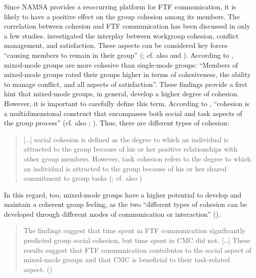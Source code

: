 \documentclass[output=paper]{langsci/langscibook}
\begin{document}
Since NAMSA provides a reoccurring platform for FTF communication, it is likely to have a positive effect on the group cohesion among its members. The correlation between cohesion and FTF communication has been discussed in only a few studies. \citet{ocker_mediating_2002} investigated the interplay between workgroup cohesion, conflict management, and satisfaction. These aspects can be considered key forces “causing members to remain in their group” (\citealt[246--247]{carron_development_1985}; cf. also \citealt[276]{brawley_assessing_1987} and \citealt{festinger_social_1950}). According to \citet[1]{ocker_mediating_2002}, mixed-mode groups are more cohesive than single-mode groups: “Members of mixed-mode groups rated their groups higher in terms of cohesiveness, the ability to manage conflict, and all aspects of satisfaction”. These findings provide a first hint that mixed-mode groups, in general, develop a higher degree of cohesion. However, it is important to carefully define this term. According to \citet[127]{shin_role_2011}, “cohesion is a multidimensional construct that encompasses both social and task aspects of the group process” (cf. also \citealt[276]{brawley_assessing_1987}; \citealt{carron_development_1985}). Thus, there are different types of cohesion:

\begin{quote}
[…] social cohesion is defined as the degree to which an individual is attracted to the group because of his or her positive relationships with other group members. However, task cohesion refers to the degree to which an individual is attracted to the group because of his or her shared commitment to group tasks (\citealt[127]{shin_role_2011}; cf. also \citealt[276]{brawley_assessing_1987})
\end{quote}

In this regard, too, mixed-mode groups have a higher potential to develop and maintain a coherent group feeling, as the two “different types of cohesion can be developed through different modes of communication or interaction” (\citealt[136]{shin_role_2011}). 

\begin{quote}
The findings suggest that time spent in FTF communication significantly predicted group social cohesion, but time spent in CMC did not. […] These results suggest that FTF communication contributes to the social aspect of mixed-mode groups and that CMC is beneficial to their task-related aspect. (\citealt[126]{shin_role_2011})
\end{quote}
\end{document}
